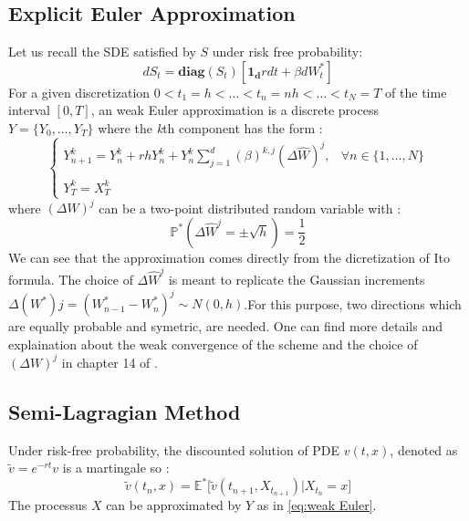 \documentclass[a4paper,10pt]{article}
\begin{document}
\subsection{Explicit Euler Approximation}
Let us recall the SDE satisfied by $S$ under risk free probability:\[d S_t = \textbf{diag}(S_t) [ \mathbf{1_d} r dt  + \beta dW_t^*]\]
For a given discretization $0<t_1=h<\dots<t_n=nh<\dots<t_N=T$ of the time interval $[0,T]$, an weak Euler approximation is a discrete process $Y=\{Y_0,\dots,Y_T\}$ 
where the \emph{k}th component has the form :
\begin{equation} \label{eq:weak Euler}
\left\lbrace 
\begin{array}{ll}
Y^k_{n+1}=Y^k_n+ r hY^k_n  + Y^k_n\sum_{j=1}^d (\beta)^{k,j} (\Delta \hat{W})^j, & \forall n \in \{1,\dots,N\}\\ \\
Y^k_T=X^k_T
\end{array}
\right.
\end{equation}
where $(\Delta W)^j$ can be a two-point distributed random variable with :
\[\mathbb{P}^*(\Delta\hat{W}^j=\pm \sqrt{h})=\frac{1}{2}\]
We can see that the approximation comes directly from the dicretization of Ito formula. The choice of $\Delta \hat{W}^j$ is meant to replicate the Gaussian increments $\Delta (W^*)j=(W^*_{n-1}-W^*_{n})^j \sim N(0,h)$.For this purpose, two directions which are equally probable and symetric, are needed. 
One can find more details and explaination about the weak convergence of the scheme and the choice of $(\Delta W)^j$ in chapter 14 of \cite{Platen}.
\subsection{Semi-Lagragian Method}
Under risk-free probability, the discounted solution of PDE $v(t,x)$, denoted as $\tilde{v}=e^{-rt}v$ is a martingale so : 
\[\tilde{v}(t_{n},x)=\mathbb{E}^*\lbrack\tilde{v}(t_{n+1},X_{t_{n+1}})|X_{t_n}=x\rbrack\]
The processus $X$ can be approximated by $Y$ as in \eqref{eq:weak Euler}.
\end{document}
